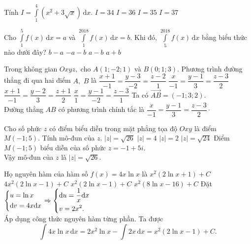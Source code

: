 \begin{ex}%
	Tính $ I=\displaystyle\int\limits_1^4\left( x^2+3\sqrt{x}\right)\mathrm{\,d}x  $.
	\choice
	{$ I=34 $}
	{$ I=36 $}
	{\True $ I=35 $}
	{$ I=37 $}
\end{ex}
\begin{ex}%
	Cho $ \displaystyle\int\limits_1^5f(x)\mathrm{\,d}x=a $ và $ \displaystyle\int\limits_1^{2018}f(x)\mathrm{\,d}x=b $. Khi đó, $ \displaystyle\int\limits_5^{2018}f(x)\mathrm{\,d}x $ bằng biểu thức nào dưới đây?
	\choice
	{\True $ b-a $}
	{$ -a-b $}
	{$ a-b $}
	{$ a+b $}
\end{ex}
\begin{ex}%
Trong không gian $ Oxyz, $ cho $ A(1;-2;1) $ và $ B(0;1;3) $. Phương trình đường thẳng đi qua hai điểm $ A, $ $ B $ là
\choice
{$ \dfrac{x+1}{-1}=\dfrac{y-3}{-2}=\dfrac{z-2}{1} $}
{\True $ \dfrac{x}{-1}=\dfrac{y-1}{3}=\dfrac{z-3}{2} $}
{$ \dfrac{x+1}{-1}=\dfrac{y-2}{3}=\dfrac{z+1}{2} $}
{$ \dfrac{x}{1}=\dfrac{y-1}{-2}=\dfrac{z-3}{1} $}
\loigiai
{Ta có $ \vec{AB}=(-1;3;2) $.\\
	Đường thẳng $ AB $ có phương trình chính tắc là $ \dfrac{x}{-1}=\dfrac{y-1}{3}=\dfrac{z-3}{2} \cdot  $
}
\end{ex}
\begin{ex}%
Cho số phức $ z $	có điểm biểu diễn trong mặt phẳng tọa độ $ Oxy $ là điểm $ M(-1;5) $. Tính mô-đun của $ z. $
	\choice
	{\True $ |z| = \sqrt{26} $}
	{$ |z| = 4$}
	{$ |z| = 2$}
	{$ |z| = \sqrt{24} $}
	\loigiai
	{Điểm $ M(-1;5) $ biểu diễn của số phức $ z  = -1+5i. $\\
	Vậy mô-đun của $ z $ là $ |z| = \sqrt{26} $.
	}
\end{ex}
\begin{ex}%
Họ nguyên hàm của hàm số $ f(x) = 4x\ln x $	là
	\choice
	{$ x^2\left(2\ln x+1\right)+C $}
	{$ 4x^2\left(2\ln x-1\right)+C $}
	{\True $ x^2\left(2\ln x-1\right)+C $}
	{$ x^2\left(8\ln x-16\right)+C $}
	\loigiai
	{Đặt $ \left\{\begin{aligned}&u=\ln x\\&\mathrm{d}v=4x\mathrm{d}x\end{aligned}\right. \Rightarrow \left\{\begin{aligned}&\mathrm{d}u=\dfrac{1}{x}\mathrm{d}x\\&v=2x^2.\end{aligned}\right. $\\
Áp dụng công thức nguyên hàm từng phần.	Ta được $$ \displaystyle \int 4x \ln x \mathrm{\,d}x=2x^2\ln x -\displaystyle \int 2x \mathrm{\,d}x = x^2\left(2\ln x-1\right)+C. $$
	}
\end{ex}

